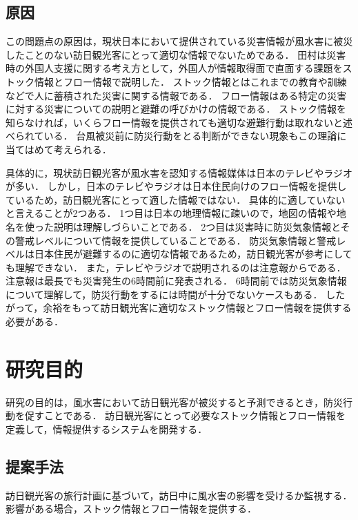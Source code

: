 \documentclass[a4paper,11pt,oneside,openany]{jsbook}
\begin{document}
\subsection{原因}
この問題点の原因は，現状日本において提供されている災害情報が風水害に被災したことのない訪日観光客にとって適切な情報でないためである．
田村\cite{Tamura2017}は災害時の外国人支援に関する考え方として，外国人が情報取得面で直面する課題をストック情報とフロー情報で説明した．
ストック情報とはこれまでの教育や訓練などで人に蓄積された災害に関する情報である．
フロー情報はある特定の災害に対する災害についての説明と避難の呼びかけの情報である．
ストック情報を知らなければ，いくらフロー情報を提供されても適切な避難行動は取れないと述べられている．
台風被災前に防災行動をとる判断ができない現象もこの理論に当てはめて考えられる．

具体的に，現状訪日観光客が風水害を認知する情報媒体は日本のテレビやラジオが多い．\cite{Typhoon}
しかし，日本のテレビやラジオは日本住民向けのフロー情報を提供しているため，訪日観光客にとって適した情報ではない．
具体的に適していないと言えることが2つある．
1つ目は日本の地理情報に疎いので，地図の情報や地名を使った説明は理解しづらいことである．
2つ目は災害時に防災気象情報とその警戒レベルについて情報を提供していることである．
防災気象情報と警戒レベルは日本住民が避難するのに適切な情報であるため，訪日観光客が参考にしても理解できない．
また，テレビやラジオで説明されるのは注意報からである．注意報は最長でも災害発生の6時間前に発表される．
6時間前では防災気象情報について理解して，防災行動をするには時間が十分でないケースもある．
したがって，余裕をもって訪日観光客に適切なストック情報とフロー情報を提供する必要がある．

\section{研究目的}
研究の目的は，風水害において訪日観光客が被災すると予測できるとき，防災行動を促すことである．
訪日観光客にとって必要なストック情報とフロー情報を定義して，情報提供するシステムを開発する．

\subsection{提案手法}
訪日観光客の旅行計画に基づいて，訪日中に風水害の影響を受けるか監視する．
影響がある場合，ストック情報とフロー情報を提供する．
\end{document}
